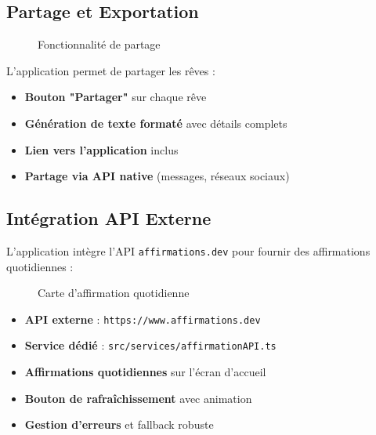 \documentclass[12pt,a4paper]{article}
\begin{document}
\subsection{Partage et Exportation}

\begin{figure}[H]
    \centering
    \caption{Fonctionnalité de partage}
\end{figure}

L'application permet de partager les rêves :

\begin{itemize}
    \item \textbf{Bouton "Partager"} sur chaque rêve
    \item \textbf{Génération de texte formaté} avec détails complets
    \item \textbf{Lien vers l'application} inclus
    \item \textbf{Partage via API native} (messages, réseaux sociaux)
\end{itemize}

\subsection{Intégration API Externe}

L'application intègre l'API \texttt{affirmations.dev} pour fournir des affirmations quotidiennes :

\begin{figure}[H]
    \centering
    \caption{Carte d'affirmation quotidienne}
\end{figure}

\begin{itemize}
    \item \textbf{API externe} : \texttt{https://www.affirmations.dev}
    \item \textbf{Service dédié} : \texttt{src/services/affirmationAPI.ts}
    \item \textbf{Affirmations quotidiennes} sur l'écran d'accueil
    \item \textbf{Bouton de rafraîchissement} avec animation
    \item \textbf{Gestion d'erreurs} et fallback robuste
\end{itemize}
\end{document}

